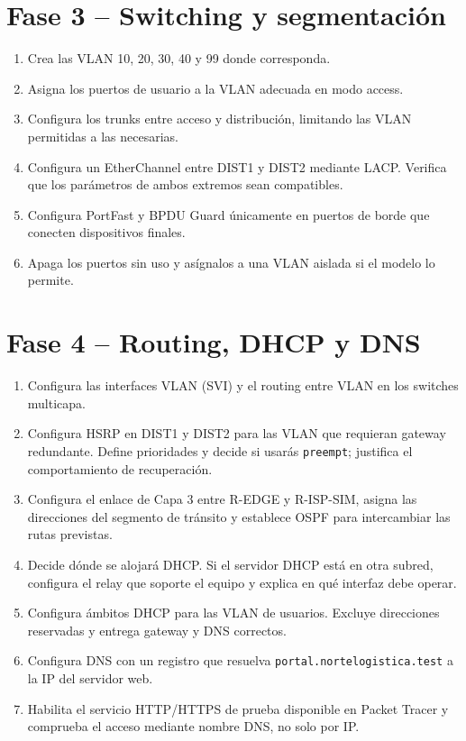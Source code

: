 \documentclass[12pt,a4paper]{article}
\begin{document}
\section{Fase 3 -- Switching y segmentación}
\begin{enumerate}[leftmargin=1.2cm]
 \item Crea las VLAN 10, 20, 30, 40 y 99 donde corresponda.
 \item Asigna los puertos de usuario a la VLAN adecuada en modo access.
 \item Configura los trunks entre acceso y distribución, limitando las VLAN permitidas a las necesarias.
 \item Configura un EtherChannel entre DIST1 y DIST2 mediante LACP. Verifica que los parámetros de ambos extremos sean compatibles.
 \item Configura PortFast y BPDU Guard únicamente en puertos de borde que conecten dispositivos finales.
 \item Apaga los puertos sin uso y asígnalos a una VLAN aislada si el modelo lo permite.
\end{enumerate}

\section{Fase 4 -- Routing, DHCP y DNS}
\begin{enumerate}[leftmargin=1.2cm]
 \item Configura las interfaces VLAN (SVI) y el routing entre VLAN en los switches multicapa.
 \item Configura HSRP en DIST1 y DIST2 para las VLAN que requieran gateway redundante. Define prioridades y decide si usarás \texttt{preempt}; justifica el comportamiento de recuperación.
 \item Configura el enlace de Capa 3 entre R-EDGE y R-ISP-SIM, asigna las direcciones del segmento de tránsito y establece OSPF para intercambiar las rutas previstas.
 \item Decide dónde se alojará DHCP. Si el servidor DHCP está en otra subred, configura el relay que soporte el equipo y explica en qué interfaz debe operar.
 \item Configura ámbitos DHCP para las VLAN de usuarios. Excluye direcciones reservadas y entrega gateway y DNS correctos.
 \item Configura DNS con un registro que resuelva \texttt{portal.nortelogistica.test} a la IP del servidor web.
 \item Habilita el servicio HTTP/HTTPS de prueba disponible en Packet Tracer y comprueba el acceso mediante nombre DNS, no solo por IP.
\end{enumerate}
\end{document}
